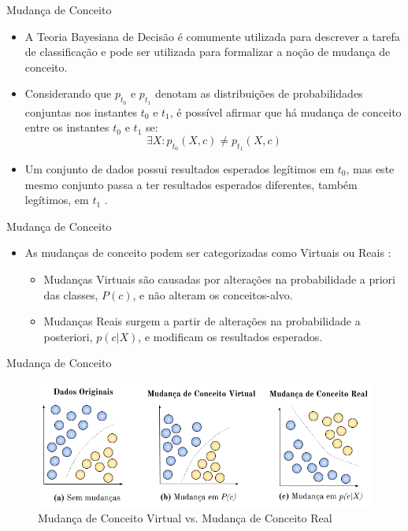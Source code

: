\documentclass[10pt]{beamer}
\begin{document}
\begin{frame}{Mudança de Conceito}
    \begin{itemize}
        \item<1 -> A Teoria Bayesiana de Decisão \cite{Duda:2000:PC:954544} é comumente utilizada para descrever a tarefa de classificação e pode ser utilizada para formalizar a noção de \alert{mudança de conceito}.
        \item<2 -> Considerando que $p_{t_0}$ e $p_{t_1}$ denotam as distribuições de probabilidades conjuntas nos instantes $t_0$ e $t_1$, é possível afirmar que há mudança de conceito entre os instantes $t_0$ e $t_1$ se:
        \begin{equation} \label{eq:3}
            {\exists}X : p_{t_0}(X, c) \ne p_{t_1}(X, c)
        \end{equation}
        \item<3 -> Um conjunto de dados possui resultados esperados legítimos em $t_0$, mas este mesmo conjunto passa a ter resultados esperados diferentes, também legítimos, em $t_1$ \cite{Kolter:2007:DWM:1314498.1390333}.
    \end{itemize}
\end{frame}

\begin{frame}{Mudança de Conceito}
    \begin{itemize}
        \item<1 -> As mudanças de conceito podem ser categorizadas como \alert{Virtuais} ou \alert{Reais} \cite{Gama:2014:SCD:2597757.2523813}:
        \begin{itemize}
        \item<2 -> \alert{Mudanças Virtuais} são causadas por alterações na probabilidade a priori das classes, $P(c)$, e não alteram os conceitos-alvo.
        \item<3 -> \alert{Mudanças Reais} surgem a partir de alterações na probabilidade a posteriori, $p(c|X)$, e modificam os resultados esperados.
        \end{itemize}
    \end{itemize}
\end{frame}

\begin{frame}{Mudança de Conceito}
\begin{figure}[H]
    \begin{center}
        \includegraphics[scale=0.5]{../text/imagens/concept_drift.png}
        \caption{Mudança de Conceito Virtual vs. Mudança de Conceito Real}
        \label{fig:real_and_virtual_concept_drift}
    \end{center}
\end{figure}
\end{frame}
\end{document}
